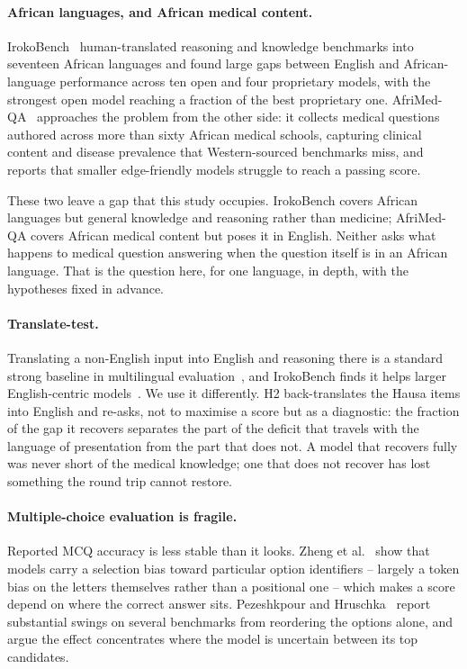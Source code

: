\documentclass[11pt,a4paper]{article}
\begin{document}
\paragraph{African languages, and African medical content.}
IrokoBench~\cite{adelani2025irokobench} human-translated reasoning and knowledge
benchmarks into seventeen African languages and found large gaps between English
and African-language performance across ten open and four proprietary models,
with the strongest open model reaching a fraction of the best proprietary one.
AfriMed-QA~\cite{olatunji2025afrimedqa} approaches the problem from the other
side: it collects medical questions authored across more than sixty African
medical schools, capturing clinical content and disease prevalence that
Western-sourced benchmarks miss, and reports that smaller edge-friendly models
struggle to reach a passing score.

These two leave a gap that this study occupies. IrokoBench covers African
languages but general knowledge and reasoning rather than medicine; AfriMed-QA
covers African medical content but poses it in English. Neither asks what
happens to medical question answering when the question itself is in an African
language. That is the question here, for one language, in depth, with the
hypotheses fixed in advance.

\paragraph{Translate-test.}
Translating a non-English input into English and reasoning there is a standard
strong baseline in multilingual evaluation~\cite{shi2023multilingual}, and
IrokoBench finds it helps larger English-centric
models~\cite{adelani2025irokobench}. We use it differently. H2 back-translates
the Hausa items into English and re-asks, not to maximise a score but as a
diagnostic: the fraction of the gap it recovers separates the part of the
deficit that travels with the language of presentation from the part that does
not. A model that recovers fully was never short of the medical knowledge; one
that does not recover has lost something the round trip cannot restore.

\paragraph{Multiple-choice evaluation is fragile.}
Reported MCQ accuracy is less stable than it looks. Zheng et
al.~\cite{zheng2024selection} show that models carry a selection bias toward
particular option identifiers -- largely a token bias on the letters themselves
rather than a positional one -- which makes a score depend on where the correct
answer sits. Pezeshkpour and Hruschka~\cite{pezeshkpour2024order} report
substantial swings on several benchmarks from reordering the options alone, and
argue the effect concentrates where the model is uncertain between its top
candidates.
\end{document}
